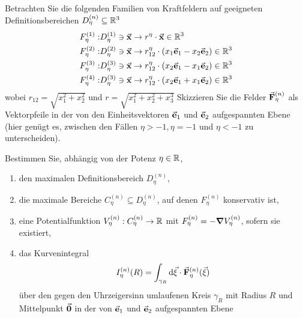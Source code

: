 \begin{Problem}
	Betrachten Sie die folgenden Familien von Kraftfeldern auf geeigneten Definitionsbereichen $D_\eta^{(n)}  \subseteq \mathbb{R}^3$
	\begin{align*}
		F_\eta^{(1)}:& D_\eta^{(1)}\ni \va x\to r^\eta\cdot \va x\in \mathbb{R}^3\\
		F_\eta^{(2)}:& D_\eta^{(2)}\ni\va x \to r_{12}^\eta\cdot(x_1\va e_1-x_2\va e_2)\in \mathbb{R}^3\\
		F_\eta^{(3)}:& D_\eta^{(3)}\ni \va x\to r_{12}^\eta\cdot\left( x_2\va e_1-x_1\va e_2 \right) \in\mathbb{R}^3\\
		F_\eta^{(4)}:&D_\eta^{(3)}\ni \va x\to r_{12}^\eta\cdot\left( x_2\va e_1+x_1\va e_2 \right) \in \mathbb{R}^3
	\end{align*}
	wobei $r_{12}=\sqrt{x_1^2+x_2^2} $ und $r=\sqrt{x_1^2+x_2^2+x_3^3} $
	Skizzieren Sie die Felder $\va F_\eta^{(n)}$ als Vektorpfeile in der von den Einheitsvektoren $\va e_1$ und $\va e_2$ aufgespannten Ebene (hier genügt es, zwischen den Fällen $\eta > -1, \eta = -1$ und $\eta < -1$ zu unterscheiden). 
	
	Bestimmen Sie, abhängig von der Potenz $\eta \in \mathbb{R}$,
	\begin{enumerate}
		\item den maximalen Definitionsbereich $D_\eta^{(n)}$,
		\item die maximale Bereiche $C_\eta^{(n)}\subseteq D_\eta^{(n)}$, auf denen $F_\eta^{(n)}$ konservativ ist,
		\item eine Potentialfunktion $V_\eta^{(n)}:C_{\eta}^{(n)}\to \mathbb{R}$ mit $F_\eta^{(n)}=-\grad{V_\eta^{(n)}}$, sofern sie existiert,
		\item das Kurvenintegral
		\[I_\eta^{(n)}(R)=\int_{\gamma_R}\dd{\va\xi}\cdot\va F_\eta^{(n)}(\va\xi)\]
		über den gegen den Uhrzeigersinn umlaufenen Kreis $\gamma_R$ mit Radius $R$ und Mittelpunkt $\va0$ in der von $\va e_1$ und $\va e_2$ aufgespannten Ebene
		\begin{center}
		\end{center}
	\end{enumerate}
\end{Problem}


